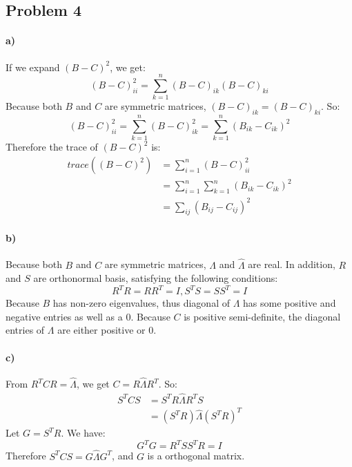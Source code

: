 \documentclass{article}
\begin{document}
\subsection*{Problem 4}
\paragraph{a)}
If we expand $(B-C)^2$, we get:
\begin{equation*}
(B-C)^2_{ii} = \sum^{n}_{k=1}(B-C)_{ik}(B-C)_{ki}
\end{equation*}
Because both $B$ and $C$ are symmetric matrices, $(B-C)_{ik} = (B-C)_{ki}$. So:
\begin{equation*}
(B-C)^2_{ii} = \sum^{n}_{k=1}(B-C)^2_{ik} = \sum^{n}_{k=1}(B_{ik}-C_{ik})^2
\end{equation*}
Therefore the trace of $(B-C)^2$ is:
\begin{align*}
trace((B-C)^2) &= \sum^{n}_{i=1}(B-C)^2_{ii} \\
&= \sum^{n}_{i=1}\sum^{n}_{k=1}(B_{ik}-C_{ik})^2 \\
&= \sum_{ij}(B_{ij}-C_{ij})^2
\end{align*}

\paragraph{b)} Because both $B$ and $C$ are symmetric matrices, $\Lambda$ and $\hat{\Lambda}$ are real. In addition, $R$ and $S$ are orthonormal basis, satisfying the following conditions:
\begin{equation*}
R^T R = R R^T = I, S^T S =S S^T = I
\end{equation*}
Because $B$ has non-zero eigenvalues, thus diagonal of $\Lambda$ has some positive and negative entries as well as a 0. Because $C$ is positive semi-definite, the diagonal entries of $\Lambda$ are either positive or 0.

\paragraph{c)} From $R^T C R = \hat{\Lambda}$, we get $C=R\hat{\Lambda}R^T$. So:
\begin{align*}
S^TCS &= S^T R\hat{\Lambda}R^T S \\
&= (S^T R) \hat{\Lambda} (S^T R)^T
\end{align*}
Let $G=S^T R$. We have:
\begin{equation*}
G^T G = R^T S S^T R = I
\end{equation*}
Therefore $S^TCS = G \hat{\Lambda} G^T$, and $G$ is a orthogonal matrix. 
\end{document}
